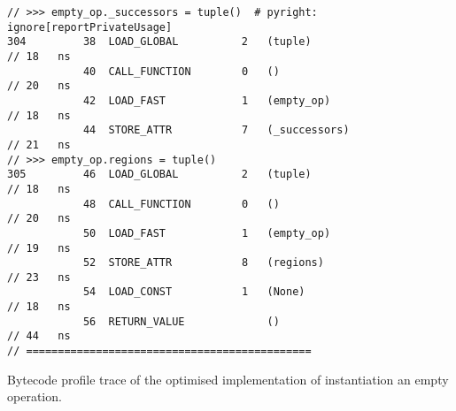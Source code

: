 \begin{code}
\begin{verbatim}
// >>> empty_op._successors = tuple()  # pyright: ignore[reportPrivateUsage]
304         38  LOAD_GLOBAL          2   (tuple)                                                    // 18   ns
            40  CALL_FUNCTION        0   ()                                                         // 20   ns
            42  LOAD_FAST            1   (empty_op)                                                 // 18   ns
            44  STORE_ATTR           7   (_successors)                                              // 21   ns
// >>> empty_op.regions = tuple()
305         46  LOAD_GLOBAL          2   (tuple)                                                    // 18   ns
            48  CALL_FUNCTION        0   ()                                                         // 20   ns
            50  LOAD_FAST            1   (empty_op)                                                 // 19   ns
            52  STORE_ATTR           8   (regions)                                                  // 23   ns
            54  LOAD_CONST           1   (None)                                                     // 18   ns
            56  RETURN_VALUE             ()                                                         // 44   ns
// =============================================
    \end{verbatim}
    \caption{Bytecode profile trace of the optimised implementation of instantiation an empty operation.}
    \label{listing:bytecode-profiles-hastrait-optimised}
\end{code}



